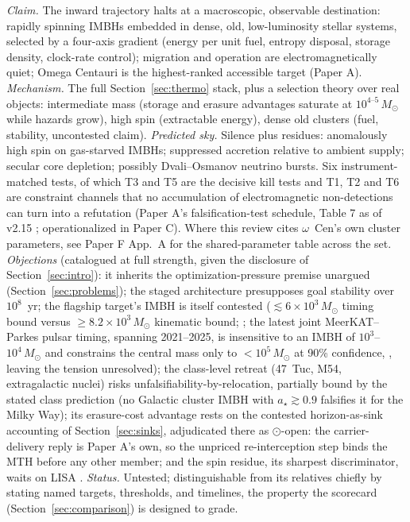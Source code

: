 \documentclass[11pt]{article}
\newcommand{\msun}{\ensuremath{M_\odot}}
\newcommand{\astar}{\ensuremath{a_\star}}
\newcommand{\shalf}{\ensuremath{\odot}} %
\begin{document}
\emph{Claim.} The inward trajectory halts at a macroscopic, observable destination: rapidly spinning IMBHs embedded in dense, old, low-luminosity stellar systems, selected by a four-axis gradient (energy per unit fuel, entropy disposal, storage density, clock-rate control); migration and operation are electromagnetically quiet; Omega Centauri is the highest-ranked accessible target (Paper A).
\emph{Mechanism.} The full Section~\ref{sec:thermo} stack, plus a selection theory over real objects: intermediate mass (storage and erasure advantages saturate at $10^{4\text{--}5}\,\msun$ while hazards grow), high spin (extractable energy), dense old clusters (fuel, stability, uncontested claim).
\emph{Predicted sky.} Silence plus residues: anomalously high spin on gas-starved IMBHs; suppressed accretion relative to ambient supply; secular core depletion; possibly Dvali--Osmanov neutrino bursts. Six instrument-matched tests, of which T3 and T5 are the decisive kill tests and T1, T2 and T6 are constraint channels that no accumulation of electromagnetic non-detections can turn into a refutation (Paper A's falsification-test schedule, Table 7 as of v2.15%
; operationalized in Paper C). Where this review cites $\omega$~Cen's own cluster parameters, see Paper F App.~A for the shared-parameter table across the set.
\emph{Objections} (catalogued at full strength, given the disclosure of Section~\ref{sec:intro}): it inherits the optimization-pressure premise unargued (Section~\ref{sec:problems}); the staged architecture presupposes goal stability over $10^{8}$~yr; the flagship target's IMBH is itself contested ($\lesssim 6\times10^{3}\,\msun$ timing bound versus $\geq 8.2\times10^{3}\,\msun$ kinematic bound; \citealt{BanaresHernandez2025,Haberle2024Nature}; the latest joint MeerKAT--Parkes pulsar timing, spanning 2021--2025, is insensitive to an IMBH of $10^{3}$--$10^{4}\,\msun$ and constrains the central mass only to $<10^{5}\,\msun$ at 90\% confidence, \citealt{ColomiBernadich2026}, leaving the tension unresolved); the class-level retreat (47~Tuc, M54, extragalactic nuclei) risks unfalsifiability-by-relocation, partially bound by the stated class prediction (no Galactic cluster IMBH with $\astar \gtrsim 0.9$ falsifies it for the Milky Way); its erasure-cost advantage rests on the contested horizon-as-sink accounting of Section~\ref{sec:sinks}, adjudicated there as \shalf-open: the carrier-delivery reply is Paper A's own, so the unpriced re-interception step binds the MTH before any other member; and the spin residue, its sharpest discriminator, waits on LISA \citep{Babak2017,Colpi2024}.
\emph{Status.} Untested; distinguishable from its relatives chiefly by stating named targets, thresholds, and timelines, the property the scorecard (Section~\ref{sec:comparison}) is designed to grade.
\end{document}
